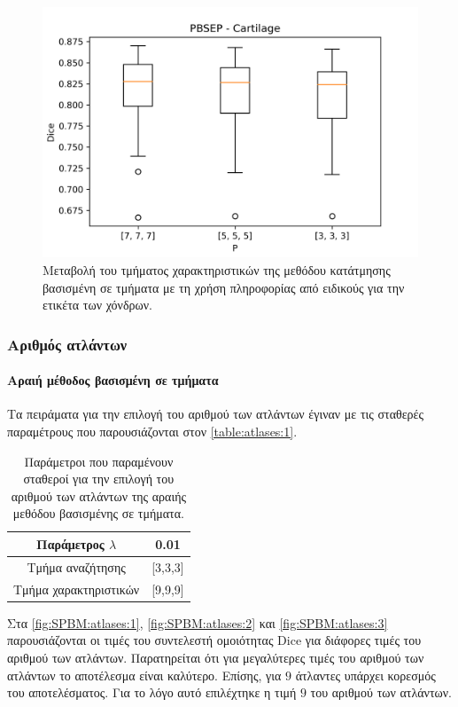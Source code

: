 \documentclass[a4paper,12pt]{article}
\newcommand{\paragraphLine}[1]{\paragraph{#1}\mbox{}}
\begin{document}
\begin{figure}[H]
    \centering
    \includegraphics[width=0.85\linewidth]{PBSEP_P_Cartilage_plot.png}
    \caption{Μεταβολή του τμήματος χαρακτηριστικών της μεθόδου κατάτμησης
             βασισμένη σε τμήματα με τη χρήση πληροφορίας από ειδικούς για την
             ετικέτα των χόνδρων.}
    \label{fig:PBSEP:P:3}
\end{figure}

\subsubsection{Αριθμός ατλάντων}

\paragraphLine{Αραιή μέθοδος βασισμένη σε τμήματα}

Τα πειράματα για την επιλογή του αριθμού των ατλάντων έγιναν με τις σταθερές
παραμέτρους που παρουσιάζονται στον \autoref{table:atlases:1}.

\begin{table}[h!]
    \centering
    \begin{tabular}{|c|c|} 
        \hline
        Παράμετρος $\lambda$ & 0.01 \\ 
        \hline
        Τμήμα αναζήτησης & [3,3,3] \\ 
        \hline
        Τμήμα χαρακτηριστικών & [9,9,9] \\ 
        \hline
    \end{tabular}
    \caption{Παράμετροι που παραμένουν σταθεροί για την επιλογή του αριθμού των
             ατλάντων της αραιής μεθόδου βασισμένης σε τμήματα.}
    \label{table:atlases:1}
\end{table}

Στα \autoref{fig:SPBM:atlases:1}, \autoref{fig:SPBM:atlases:2} και
\autoref{fig:SPBM:atlases:3} παρουσιάζονται οι τιμές του συντελεστή ομοιότητας
Dice για διάφορες τιμές του αριθμού των ατλάντων. Παρατηρείται ότι για
μεγαλύτερες τιμές του αριθμού των ατλάντων το αποτέλεσμα είναι καλύτερο. Επίσης,
για $9$ άτλαντες υπάρχει κορεσμός του αποτελέσματος. Για το λόγο αυτό επιλέχτηκε
η τιμή $9$ του αριθμού των ατλάντων.
\end{document}
